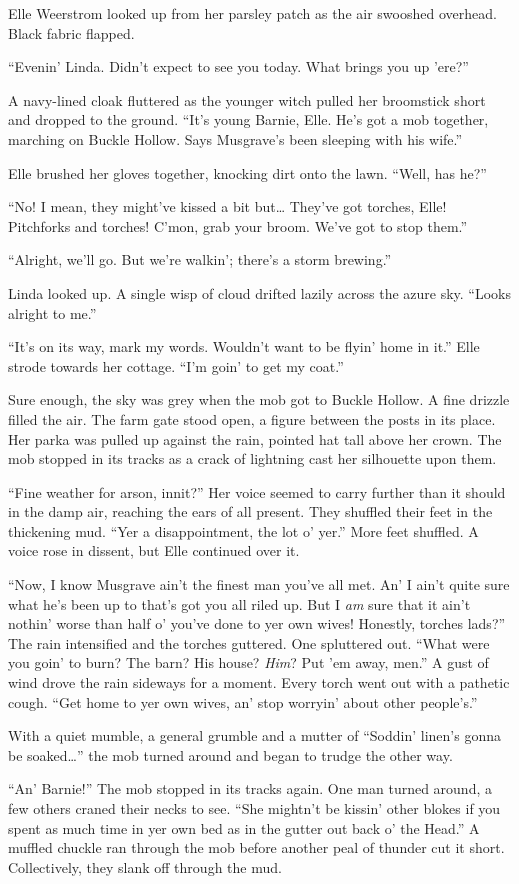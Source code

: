 Elle Weerstrom looked up from her parsley patch as the air swooshed overhead.
Black fabric flapped.

``Evenin' Linda.
Didn't expect to see you today.
What brings you up 'ere?''

A navy-lined cloak fluttered as the younger witch pulled her broomstick short and dropped to the ground.
``It's young Barnie, Elle.
He's got a mob together, marching on Buckle Hollow.
Says Musgrave's been sleeping with his wife.''

Elle brushed her gloves together, knocking dirt onto the lawn.
``Well, has he?''

``No!
I mean, they might've kissed a bit but{\dots}
They've got torches, Elle!
Pitchforks and torches!
C'mon, grab your broom.
We've got to stop them.''

``Alright, we'll go.
But we're walkin'; there's a storm brewing.''

Linda looked up.
A single wisp of cloud drifted lazily across the azure sky.
``Looks alright to me.''

``It's on its way, mark my words.
Wouldn't want to be flyin' home in it.''
Elle strode towards her cottage.
``I'm goin' to get my coat.''

\storybreak

Sure enough, the sky was grey when the mob got to Buckle Hollow.
A fine drizzle filled the air.
The farm gate stood open, a figure between the posts in its place.
Her parka was pulled up against the rain, pointed hat tall above her crown.
The mob stopped in its tracks as a crack of lightning cast her silhouette upon them.

``Fine weather for arson, innit?''
Her voice seemed to carry further than it should in the damp air, reaching the ears of all present.
They shuffled their feet in the thickening mud.
``Yer a disappointment, the lot o' yer.''
More feet shuffled.
A voice rose in dissent, but Elle continued over it.

``Now, I know Musgrave ain't the finest man you've all met.
An' I ain't quite sure what he's been up to that's got you all riled up.
But I \emph{am} sure that it ain't nothin' worse than half o' you've done to yer own wives!
Honestly, torches lads?''
The rain intensified and the torches guttered.
One spluttered out.
``What were you goin' to burn?
The barn?
His house?
\emph{Him}?
Put 'em away, men.''
A gust of wind drove the rain sideways for a moment.
Every torch went out with a pathetic cough.
``Get home to yer own wives, an' stop worryin' about other people's.''

With a quiet mumble, a general grumble and a mutter of ``Soddin' linen's gonna be soaked\dots'' the mob turned around and began to trudge the other way.

``An' Barnie!''
The mob stopped in its tracks again.
One man turned around, a few others craned their necks to see.
``She mightn't be kissin' other blokes if you spent as much time in yer own bed as in the gutter out back o' the Head.''
A muffled chuckle ran through the mob before another peal of thunder cut it short.
Collectively, they slank off through the mud.
